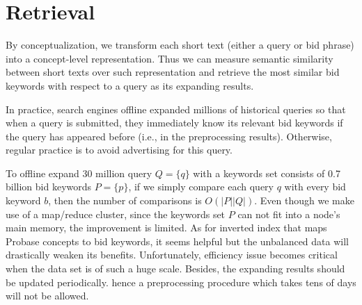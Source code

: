 \section{Retrieval}
\label{sec:retrieval}
By conceptualization, we transform each short text (either a query or
        bid phrase) into a concept-level representation. Thus we can measure semantic similarity between short
texts over such representation and retrieve the most similar bid
keywords with respect to a query as its expanding results.


In practice, search engines offline expanded millions of historical
queries so that when a query is submitted, they immediately
know its relevant bid keywords if the query has appeared before (i.e.,
        in the preprocessing results). Otherwise, regular practice is to avoid advertising for this query.


To offline expand 30 million query $Q=\{q\}$ with a
keywords set consists of 0.7 billion bid keywords $P=\{p\}$, if we
simply compare each query $q$ with every bid keyword $b$, then the
number of comparisons is $O(\vert{}P\vert{}\vert{}Q\vert{})$. Even
though we make use of a map/reduce cluster, since the keywords set $P$ can not
fit into a node's main memory, the improvement is limited.  As for inverted
index that maps Probase concepts to bid keywords, it seems helpful but
the unbalanced data will drastically weaken its benefits.
Unfortunately, efficiency issue becomes critical when the data set is
of such a huge scale.  Besides, the expanding results should be
updated periodically. hence a preprocessing procedure which takes tens
of days will not be allowed.


